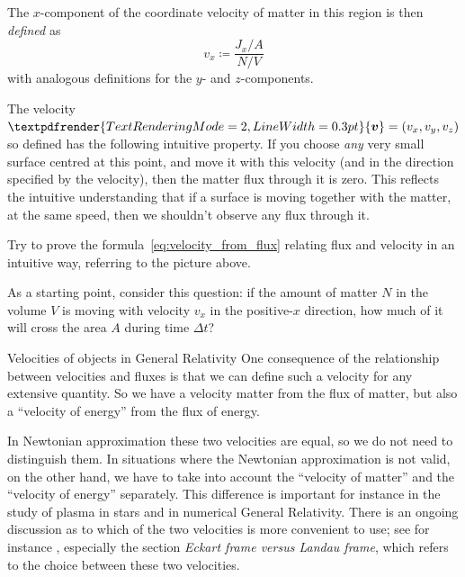 \documentclass[a4paper,12pt,%
onecolumn,oneside,%
british%
]{memoir}
\renewcommand*{\bm}[1]{\textpdfrender{TextRenderingMode=2,LineWidth=0.3pt}{\boldsymbol{#1}}}
\newcommand*{\incr}{\Delta}%
\newcommand*{\defd}{\coloneqq}
\renewcommand*{\|}[1][]{\nonscript\:#1\vert\nonscript\:\mathopen{}}
\newcommand*{\yv}{\bm{v}}
\newcommand*{\Dt}{\incr t}
\newcommand*{\yN}{N}
\begin{document}
The $x$-component of the coordinate velocity of matter in this region is then \emph{defined} as
\begin{equation}
  \label{eq:velocity_from_flux}
  v_{x} \defd \frac{J_{x}/A}{\yN/V}
\end{equation}
with analogous definitions for the $y$- and $z$-components.


The velocity $\yv=(v_{x}, v_{y}, v_{z})$ so defined has the following intuitive property. If you choose \emph{any} very small surface centred at this point, and move it with this velocity (and in the direction specified by the velocity), then the matter flux through it is zero. This reflects the intuitive understanding that if a surface is moving together with the matter, at the same speed, then we shouldn't observe any flux through it.

\begin{exercise}
  Try to prove the formula~\eqref{eq:velocity_from_flux} relating flux and velocity in an intuitive way, referring to the picture above.

  As a starting point, consider this question: if the amount of matter $\yN$ in the volume $V$ is moving with velocity $v_{x}$ in the positive-$x$ direction, how much of it will cross the area $A$ during time $\Dt$?
\end{exercise}

\medskip


\begin{extra}{Velocities of objects in General Relativity}
  One consequence of the relationship between velocities and fluxes is that we can define such a velocity for any extensive quantity. So we have a velocity matter from the flux of matter, but also a \enquote{velocity of energy} from the flux of energy.

  In Newtonian approximation these two velocities are equal, so we do not need to distinguish them. In situations where the Newtonian approximation is not valid, on the other hand, we have to take into account the \enquote{velocity of matter} and the \enquote{velocity of energy} separately. This difference is important for instance in the study of plasma in stars and in numerical General Relativity. There is an ongoing discussion as to which of the two velocities is more convenient to use; see for instance \cites{kandusetal2008}, especially the section \emph{Eckart frame versus Landau frame}, which refers to the choice between these two velocities.
\end{extra}
\end{document}
